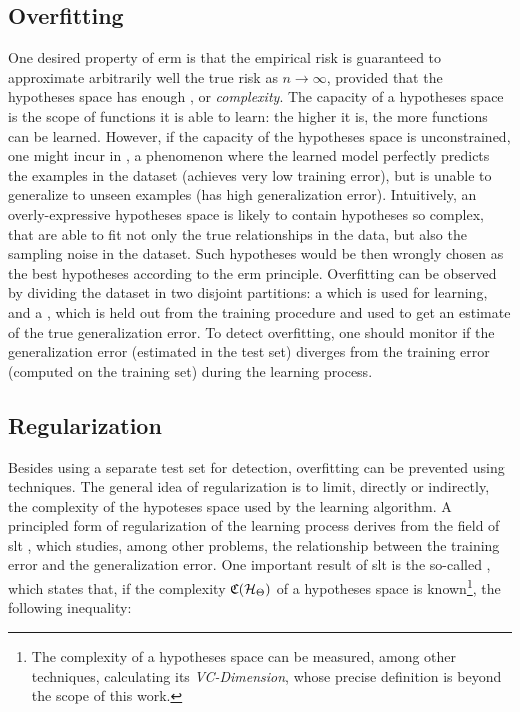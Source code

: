 \subsection{Overfitting}
One desired property of \gls{erm} is that the empirical risk is guaranteed to approximate arbitrarily well the true risk as $n \to \infty$, provided that the hypotheses space has enough , or \emph{complexity}. The capacity of a hypotheses space is the scope of functions it is able to learn: the higher it is, the more  functions can be learned. However, if the capacity of the hypotheses space is unconstrained, one might incur in , a phenomenon where the learned model perfectly predicts the examples in the dataset (achieves very low training error), but is unable to generalize to unseen examples (has high generalization error). Intuitively, an overly-expressive hypotheses space is likely to contain hypotheses so complex, that are able to fit not only the true relationships in the data, but also the sampling noise in the dataset. Such hypotheses would be then wrongly chosen as the best hypotheses according to the \gls{erm} principle. Overfitting can be observed by dividing the dataset in two disjoint partitions: a  which is used for learning, and a , which is held out from the training procedure and used to get an estimate of the true generalization error. To detect overfitting, one should monitor if the generalization error (estimated in the test set) diverges from the training error (computed on the training set) during the learning process.

\subsection{Regularization}
Besides using a separate test set for detection, overfitting can be prevented \apriori using  techniques. The general idea of regularization is to limit, directly or indirectly, the complexity of the hypoteses space used by the learning algorithm. A principled form of regularization of the learning process derives from the field of \gls{slt} \citep{vapnik2000slt}, which studies, among other problems, the relationship between the training error and the generalization error.  One important result of \gls{slt} is the so-called , which states that, if the complexity $\Complexity(\HSpace)$ of a hypotheses space is known\footnote{The complexity of a hypotheses space can be measured, among other techniques, calculating its \emph{VC-Dimension}, whose precise definition is beyond the scope of this work.}, the following inequality:


